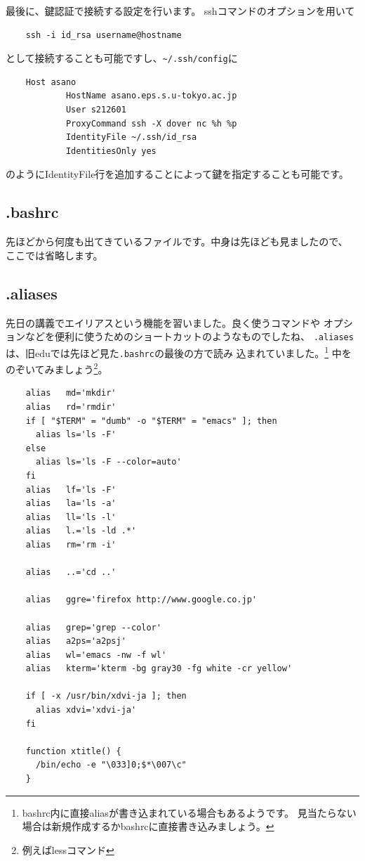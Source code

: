 \documentclass[a4j]{ltjreport}
\begin{document}
    最後に、鍵認証で接続する設定を行います。
    sshコマンドのオプションを用いて
    \begin{verbatim}
    ssh -i id_rsa username@hostname
    \end{verbatim}
    として接続することも可能ですし、\verb|~/.ssh/config|に
    \begin{verbatim}
    Host asano
            HostName asano.eps.s.u-tokyo.ac.jp
            User s212601
            ProxyCommand ssh -X dover nc %h %p
            IdentityFile ~/.ssh/id_rsa
            IdentitiesOnly yes
    \end{verbatim}
    のようにIdentityFile行を追加することによって鍵を指定することも可能です。

    \subsection{.bashrc}
    先ほどから何度も出てきているファイルです。中身は先ほども見ましたので、
    ここでは省略します。

    \subsection{.aliases}
    先日の講義でエイリアスという機能を習いました。良く使うコマンドや
    オプションなどを便利に使うためのショートカットのようなものでしたね、
    \verb+.aliases+は、旧eduでは先ほど見た\verb+.bashrc+の最後の方で読み
    込まれていました。\footnote{bashrc内に直接aliasが書き込まれている場合もあるようです。
    見当たらない場合は新規作成するかbashrcに直接書き込みましょう。}
    中をのぞいてみましょう\footnote{例えばlessコマンド}。
    \begin{verbatim}
    alias	md='mkdir'
    alias	rd='rmdir'
    if [ "$TERM" = "dumb" -o "$TERM" = "emacs" ]; then
      alias	ls='ls -F'
    else
      alias	ls='ls -F --color=auto'
    fi
    alias	lf='ls -F'
    alias	la='ls -a'
    alias	ll='ls -l'
    alias	l.='ls -ld .*'
    alias	rm='rm -i'

    alias   ..='cd ..'

    alias   ggre='firefox http://www.google.co.jp'

    alias	grep='grep --color'
    alias	a2ps='a2psj'
    alias	wl='emacs -nw -f wl'
    alias	kterm='kterm -bg gray30 -fg white -cr yellow'

    if [ -x /usr/bin/xdvi-ja ]; then
      alias	xdvi='xdvi-ja'
    fi

    function xtitle() {
      /bin/echo -e "\033]0;$*\007\c"
    }
    \end{verbatim}
\end{document}
